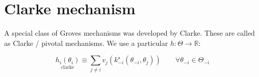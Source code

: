 \documentclass[10pt,a4paper]{article}
\begin{document}
% 
% 
% 
% 
% 
% 
% 


% 
% 


\section{Clarke mechanism}

A special class of Groves mechanisms was developed by Clarke. These are
called as Clarke / pivotal mechanisms. We use a particular $h: \Theta \rightarrow \mathbb R$:

\begin{equation}
    \underset{\text{clarke}}{h_i(\theta_i)} \equiv
    \sum_{j \neq i} v_j(k_{-i}^\star(\theta_{-i}, \theta_j))
    \qquad \forall \theta_{-i} \in \Theta_{-i}
\end{equation}
\end{document}
